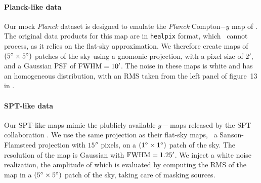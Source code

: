 \paragraph{Planck-like data}  %
Our mock \textit{Planck} dataset is designed to emulate the \textit{Planck} Compton$-y$ map of \citet{planck_collaboration_planck_2016}.
The original data products for this map are in \texttt{healpix} format, which \panco\ cannot process, as it relies on the flat-sky approximation.
We therefore create maps of $(5\degree \times 5\degree)$ patches of the sky using a gnomonic projection, with a pixel size of $2'$, and a Gaussian PSF of ${\rm FWHM} = 10'$.
The noise in these maps is white and has an homogeneous distribution, with an RMS taken from the left panel of figure~13 in \citet{planck_collaboration_planck_2016}.

\paragraph{SPT-like data}  %
Our SPT-like maps mimic the plublicly available $y-$maps released by the SPT collaboration \citep{bleem_cmbksz_2022}.
We use the same projection as their flat-sky maps, \ie\ a Sanson-Flamsteed projection with $15''$ pixels, on a $(1\degree \times 1\degree)$ patch of the sky.
The resolution of the map is Gaussian with ${\rm FWHM} = 1.25'$.
We inject a white noise realization, the amplitude of which is evaluated by computing the RMS of the map in a $(5\degree \times 5\degree)$ patch of the sky, taking care of masking sources.

